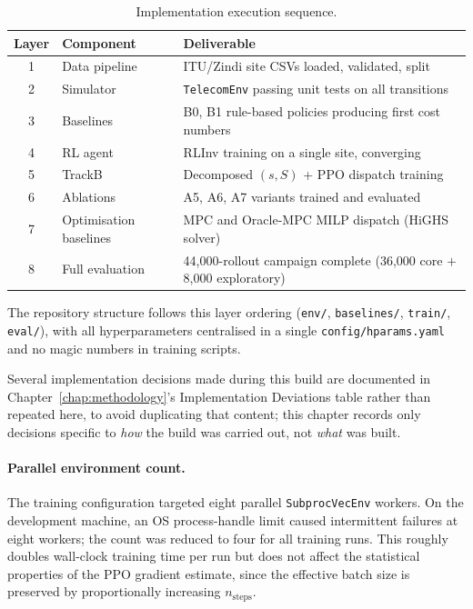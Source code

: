 \begin{table}[htb]
\centering
\small
\caption{Implementation execution sequence.}
\label{tab:impl_sequence}
\begin{tabular}{cp{2.6cm}p{8.2cm}}
\toprule
\textbf{Layer} & \textbf{Component} & \textbf{Deliverable} \\
\midrule
1 & Data pipeline   & ITU/Zindi site CSVs loaded, validated, split \\
2 & Simulator       & \texttt{TelecomEnv} passing unit tests on all transitions \\
3 & Baselines       & B0, B1 rule-based policies producing first cost numbers \\
4 & RL agent        & RLInv training on a single site, converging \\
5 & TrackB          & Decomposed $(s,S)$ + PPO dispatch training \\
6 & Ablations       & A5, A6, A7 variants trained and evaluated \\
7 & Optimisation baselines & MPC and Oracle-MPC MILP dispatch (HiGHS solver) \\
8 & Full evaluation & 44{,}000-rollout campaign complete (36{,}000 core $+$
                        8{,}000 exploratory) \\
\bottomrule
\end{tabular}
\end{table}

The repository structure follows this layer ordering
(\texttt{env/}, \texttt{baselines/}, \texttt{train/}, \texttt{eval/}),
with all hyperparameters centralised in a single
\texttt{config/hparams.yaml} and no magic numbers in training scripts.

Several implementation decisions made during this build are documented
in Chapter~\ref{chap:methodology}'s Implementation Deviations table
rather than repeated here, to avoid duplicating that content; this
chapter records only decisions specific to \emph{how} the build was
carried out, not \emph{what} was built.

\paragraph{Parallel environment count.} The training configuration
targeted eight parallel \texttt{SubprocVecEnv} workers. On the
development machine, an OS process-handle limit caused intermittent
failures at eight workers; the count was reduced to four for all
training runs. This roughly doubles wall-clock training time per run but
does not affect the statistical properties of the PPO gradient estimate,
since the effective batch size is preserved by proportionally increasing
$n_{\text{steps}}$.

